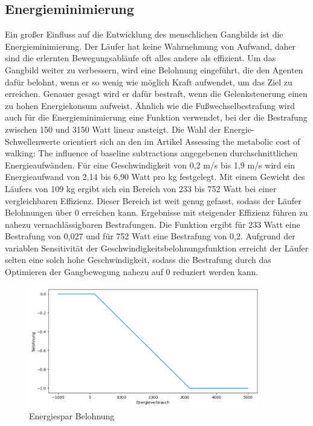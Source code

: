 \subsection{Energieminimierung}
Ein großer Einfluss auf die Entwicklung des menschlichen Gangbilds ist die Energieminimierung. Der Läufer hat keine Wahrnehmung von Aufwand, daher sind die erlernten Bewegungsabläufe oft alles andere als effizient. Um das Gangbild weiter zu verbessern, wird eine Belohnung eingeführt, die den Agenten dafür belohnt, wenn er so wenig wie möglich Kraft aufwendet, um das Ziel zu erreichen. Genauer gesagt wird er dafür bestraft, wenn die Gelenksteuerung einen zu hohen Energiekonsum aufweist. Ähnlich wie die Fußwechselbestrafung wird auch für die Energieminimierung eine Funktion verwendet, bei der die Bestrafung zwischen 150 und 3150 Watt linear ansteigt. Die Wahl der Energie-Schwellenwerte orientiert sich an den im Artikel \grqq{}Assessing the metabolic cost of walking: The influence of baseline subtractions\grqq{} angegebenen durchschnittlichen Energieaufwänden.\cite{5333126}  Für eine Geschwindigkeit von 0,2 m/s bis 1,9 m/s wird ein Energieaufwand von 2,14 bis 6,90 Watt pro kg festgelegt. Mit einem Gewicht des Läufers von 109 kg ergibt sich ein Bereich von 233 bis 752 Watt bei einer vergleichbaren Effizienz. Dieser Bereich ist weit genug gefasst, sodass der Läufer Belohnungen über 0 erreichen kann. Ergebnisse mit steigender Effizienz führen zu nahezu vernachlässigbaren Bestrafungen. Die Funktion ergibt für 233 Watt eine Bestrafung von 0,027 und für 752 Watt eine Bestrafung von 0,2. Aufgrund der variablen Sensitivität der Geschwindigkeitsbelohnungsfunktion erreicht der Läufer selten eine solch hohe Geschwindigkeit, sodass die Bestrafung durch das Optimieren der Gangbewegung nahezu auf 0 reduziert werden kann.

\begin{figure}[H]
  \centering
  \includegraphics[width=0.9\textwidth]{img/plot_energiespar} 
  \caption{Energiespar Belohnung}
  \label{fig:plot_energiespar}
\end{figure}

